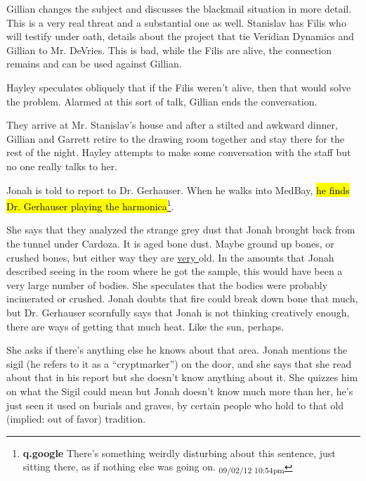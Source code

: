 Gillian changes the subject and discusses the blackmail situation in more detail.  This is a very real threat and a substantial one as well.  Stanislav has Filis who will testify under oath, details about the project that tie Veridian Dynamics and Gillian to Mr. DeVries.  This is bad, while the Filis are alive, the connection remains and can be used against Gillian.



Hayley speculates obliquely that if the Filis weren't alive, then that would solve the problem.  Alarmed at this sort of talk, Gillian ends the conversation.



They arrive at Mr. Stanislav's house and after a stilted and awkward dinner, Gillian and Garrett retire to the drawing room together and stay there for the rest of the night.  Hayley attempts to make some conversation with the staff but no one really talks to her.






Jonah is told to report to Dr. Gerhauser.  When he walks into MedBay, \hl{he finds Dr. Gerhauser playing the harmonica}\footnote{\textbf{q.google }There's something weirdly disturbing about this sentence, just sitting there, as if nothing else was going on. \textsubscript{09/02/12 10:54pm}}.



She says that they analyzed the strange grey dust that Jonah brought back from the tunnel under Cardoza.  It is aged bone dust.  Maybe ground up bones, or crushed bones, but either way they are \underline{ very } old.  In the amounts that Jonah described seeing in the room where he got the sample, this would have been a very large number of bodies.  She speculates that the bodies were probably incinerated or crushed.  Jonah doubts that fire could break down bone that much, but Dr. Gerhauser scornfully says that Jonah is not thinking creatively enough, there are ways of getting that much heat.  Like the sun, perhaps.



She asks if there's anything else he knows about that area.  Jonah mentions the sigil (he refers to it as a ``cryptmarker'') on the door, and she says that she read about that in his report but she doesn't know anything about it.  She quizzes him on what the Sigil could mean but Jonah doesn't know much more than her, he's just seen it used on burials and graves, by certain people who hold to that old (implied: out of favor) tradition.



